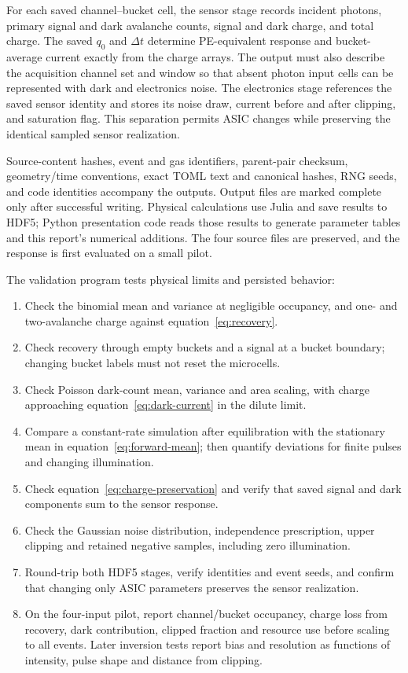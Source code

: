 \documentclass[11pt]{article}
\begin{document}
For each saved channel--bucket cell, the sensor stage records incident
photons, primary signal and dark avalanche counts, signal and dark charge,
and total charge. The saved $q_0$ and $\Delta t$ determine PE-equivalent
response and bucket-average current exactly from the charge arrays. The output
must also describe the acquisition channel set and window so that absent
photon input cells can be represented with dark and electronics noise.
The electronics stage references the saved sensor identity and stores its
noise draw, current before and after clipping, and saturation flag. This
separation permits ASIC changes while preserving the identical sampled
sensor realization.

Source-content hashes, event and gas identifiers, parent-pair checksum,
geometry/time conventions, exact TOML text and canonical hashes, RNG seeds,
and code identities accompany the outputs. Output files are marked complete
only after successful writing. Physical calculations use Julia and save
results to HDF5; Python presentation code reads those results to generate
parameter tables and this report's numerical additions. The four source
files are preserved, and the response is first evaluated on a small pilot.

The validation program tests physical limits and persisted behavior:
\begin{enumerate}
\item Check the binomial mean and variance at negligible occupancy, and
one- and two-avalanche charge against equation~\eqref{eq:recovery}.
\item Check recovery through empty buckets and a signal at a bucket
boundary; changing bucket labels must not reset the microcells.
\item Check Poisson dark-count mean, variance and area scaling, with
charge approaching equation~\eqref{eq:dark-current} in the dilute limit.
\item Compare a constant-rate simulation after equilibration with the
stationary mean in equation~\eqref{eq:forward-mean}; then quantify deviations
for finite pulses and changing illumination.
\item Check equation~\eqref{eq:charge-preservation} and verify that saved
signal and dark components sum to the sensor response.
\item Check the Gaussian noise distribution, independence prescription,
upper clipping and retained negative samples, including zero illumination.
\item Round-trip both HDF5 stages, verify identities and event seeds, and
confirm that changing only ASIC parameters preserves the sensor realization.
\item On the four-input pilot, report channel/bucket occupancy, charge loss
from recovery, dark contribution, clipped fraction and resource use before
scaling to all events. Later inversion tests report bias and resolution as
functions of intensity, pulse shape and distance from clipping.
\end{enumerate}
\end{document}
